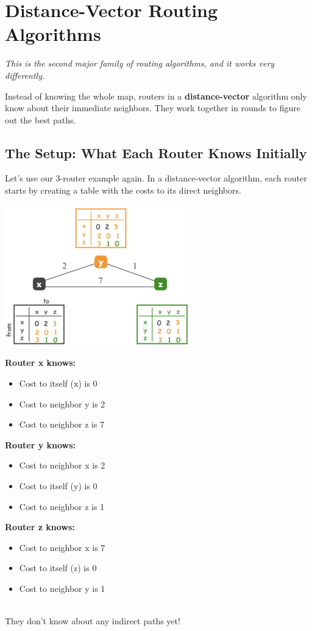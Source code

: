 \documentclass[../../compsys.tex]{subfiles}
\begin{document}
\section{Distance-Vector Routing Algorithms}
\textit{This is the second major family of routing algorithms, and it works very differently.}

Instead of knowing the whole map, routers in a \textbf{distance-vector} algorithm only know about their immediate neighbors. They work together in rounds to figure out the best paths.

\subsection{The Setup: What Each Router Knows Initially}
Let's use our 3-router example again. In a distance-vector algorithm, each router starts by creating a table with the costs to its direct neighbors.

\begin{center}
    \includegraphics[width=0.6\textwidth]{images/dijkstra-example.png}
\end{center}
\begin{minipage}{0.3\textwidth}
\textbf{Router x knows:}
\begin{itemize}
    \item Cost to itself (x) is 0
    \item Cost to neighbor y is 2
    \item Cost to neighbor z is 7
\end{itemize}
\end{minipage}
\begin{minipage}{0.3\textwidth}
\textbf{Router y knows:}
\begin{itemize}
    \item Cost to neighbor x is 2
    \item Cost to itself (y) is 0
    \item Cost to neighbor z is 1
\end{itemize}
\end{minipage}
\begin{minipage}{0.3\textwidth}
\textbf{Router z knows:}
\begin{itemize}
    \item Cost to neighbor x is 7
    \item Cost to itself (z) is 0
    \item Cost to neighbor y is 1
\end{itemize}
\end{minipage}\\[10px]
They don't know about any indirect paths yet!
\end{document}
